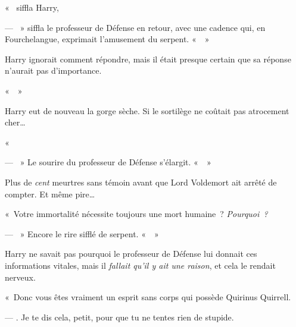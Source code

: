 «~ siffla Harry, 

--- ~» siffla le professeur de Défense en retour, avec une cadence qui, en Fourchelangue, exprimait l'amusement du serpent.
«~~»

Harry ignorait comment répondre, mais il était presque certain que sa réponse n'aurait pas d'importance.

«~~»

Harry eut de nouveau la gorge sèche.
Si le sortilège ne coûtait pas atrocement cher…

«~

--- ~» Le sourire du professeur de Défense s'élargit.
«~~»

Plus de \emph{cent} meurtres sans témoin avant que Lord Voldemort ait arrêté de compter.
Et même pire…

«~Votre immortalité nécessite toujours une mort humaine~?
\emph{Pourquoi~?}

--- ~» Encore le rire sifflé de serpent.
«~~»

Harry ne savait pas pourquoi le professeur de Défense lui donnait ces informations vitales, mais il \emph{fallait qu'il y ait une raison}, et cela le rendait nerveux.

«~Donc vous êtes vraiment un esprit sans corps qui possède Quirinus Quirrell.

--- .
Je te dis cela, petit, pour que tu ne tentes rien de stupide.

